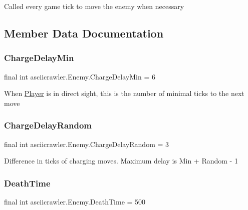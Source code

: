 Called every game tick to move the enemy when necessary 

\subsection{Member Data Documentation}
\mbox{\label{classasciicrawler_1_1Enemy_a68c41f5b3ff03ce66a0a7748c6dcae31}} 
\subsubsection{\texorpdfstring{Charge\+Delay\+Min}{ChargeDelayMin}}
{\footnotesize\ttfamily final int asciicrawler.\+Enemy.\+Charge\+Delay\+Min = 6\hspace{0.3cm}{\ttfamily [static]}}

When \hyperlink{classasciicrawler_1_1Player}{Player} is in direct sight, this is the number of minimal ticks to the next move \mbox{\label{classasciicrawler_1_1Enemy_a5d4281f4774665c377922b28bc53a142}} 
\subsubsection{\texorpdfstring{Charge\+Delay\+Random}{ChargeDelayRandom}}
{\footnotesize\ttfamily final int asciicrawler.\+Enemy.\+Charge\+Delay\+Random = 3\hspace{0.3cm}{\ttfamily [static]}}

Difference in ticks of charging moves. Maximum delay is Min + Random -\/ 1 \mbox{\label{classasciicrawler_1_1Enemy_ac44d10fa43eb6b9507eb8876f52c0d28}} 
\subsubsection{\texorpdfstring{Death\+Time}{DeathTime}}
{\footnotesize\ttfamily final int asciicrawler.\+Enemy.\+Death\+Time = 500\hspace{0.3cm}{\ttfamily [static]}}

